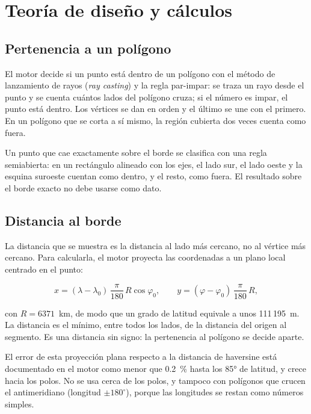 \section{Teoría de diseño y cálculos}

\subsection{Pertenencia a un polígono}

El motor decide si un punto está dentro de un polígono con el método de lanzamiento de rayos
(\emph{ray casting}) y la regla par-impar: se traza un rayo desde el punto y se cuenta cuántos
lados del polígono cruza; si el número es impar, el punto está dentro. Los vértices se dan en
orden y el último se une con el primero. En un polígono que se corta a sí mismo, la región
cubierta dos veces cuenta como fuera.

Un punto que cae exactamente sobre el borde se clasifica con una regla semiabierta: en un
rectángulo alineado con los ejes, el lado sur, el lado oeste y la esquina suroeste cuentan como
dentro, y el resto, como fuera. El resultado sobre el borde exacto no debe usarse como dato.

\subsection{Distancia al borde}

La distancia que se muestra es la distancia al lado más cercano, no al vértice más cercano. Para
calcularla, el motor proyecta las coordenadas a un plano local centrado en el punto:

\begin{equation}
x = (\lambda - \lambda_0)\,\frac{\pi}{180}\,R\cos\varphi_0, \qquad
y = (\varphi - \varphi_0)\,\frac{\pi}{180}\,R,
\end{equation}

con $R = 6371$~km, de modo que un grado de latitud equivale a unos 111\,195~m. La distancia es
el mínimo, entre todos los lados, de la distancia del origen al segmento. Es una distancia sin
signo: la pertenencia al polígono se decide aparte.

El error de esta proyección plana respecto a la distancia de haversine está documentado en el
motor como menor que 0.2~\% hasta los 85° de latitud, y crece hacia los polos. No se usa cerca de
los polos, y tampoco con polígonos que crucen el antimeridiano (longitud $\pm180^\circ$), porque
las longitudes se restan como números simples.

